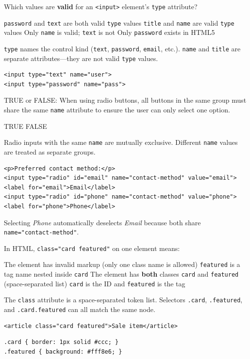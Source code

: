 \question[4]
Which values are \textbf{valid} for an \texttt{<input>} element's \texttt{type} attribute?
\begin{choices}
  \CorrectChoice \texttt{password} and \texttt{text} are both valid \texttt{type} values
  \choice \texttt{title} and \texttt{name} are valid \texttt{type} values
  \choice Only \texttt{name} is valid; \texttt{text} is not
  \choice Only \texttt{password} exists in HTML5
\end{choices}
\begin{solution}
  \texttt{type} names the control kind (\texttt{text}, \texttt{password}, \texttt{email}, etc.). \texttt{name} and \texttt{title} are separate attributes---they are not valid \texttt{type} values.
\begin{lstlisting}[style=htmlinline]
<input type="text" name="user">
<input type="password" name="pass">
\end{lstlisting}
\end{solution}

\question[4]
TRUE or FALSE: When using radio buttons, all buttons in the same group must share the same \texttt{name} attribute to ensure the user can only select one option.
\begin{choices}
  \CorrectChoice TRUE
  \choice FALSE
\end{choices}
\begin{solution}
  Radio inputs with the same \texttt{name} are mutually exclusive. Different \texttt{name} values are treated as separate groups.
\begin{lstlisting}[style=htmlinline]
<p>Preferred contact method:</p>
<input type="radio" id="email" name="contact-method" value="email">
<label for="email">Email</label>
<input type="radio" id="phone" name="contact-method" value="phone">
<label for="phone">Phone</label>
\end{lstlisting}
  Selecting \emph{Phone} automatically deselects \emph{Email} because both share \texttt{name="contact-method"}.
\end{solution}

\question[4]
In HTML, \texttt{class="card featured"} on one element means:
\begin{choices}
  \choice The element has invalid markup (only one class name is allowed)
  \choice \texttt{featured} is a tag name nested inside \texttt{card}
  \CorrectChoice The element has \textbf{both} classes \texttt{card} and \texttt{featured} (space-separated list)
  \choice \texttt{card} is the ID and \texttt{featured} is the tag
\end{choices}
\begin{solution}
  The \texttt{class} attribute is a space-separated token list. Selectors \texttt{.card}, \texttt{.featured}, and \texttt{.card.featured} can all match the same node.
\begin{lstlisting}[style=htmlinline]
<article class="card featured">Sale item</article>
\end{lstlisting}
\begin{lstlisting}[style=cssinline]
.card { border: 1px solid #ccc; }
.featured { background: #fff8e6; }
\end{lstlisting}
\end{solution}

